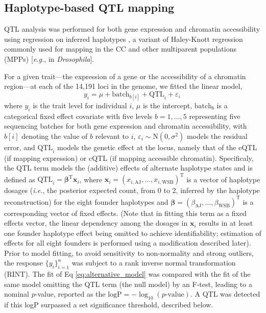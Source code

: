 \documentclass[9pt,twocolumn,twoside]{gsajnl}
\newcommand{\eg}{\emph{e.g.}\xspace}
\newcommand{\ie}{\emph{i.e.}\xspace}
\newcommand{\T}{^\mathrm{T}}
\newcommand{\bbeta}{\boldsymbol{\beta}}
\newcommand{\bx}{\mathbf{x}}
\begin{document}
\subsection{Haplotype-based QTL mapping}

QTL analysis was performed for both gene expression and chromatin accessibility using regression on inferred haplotypes \citep{Mott2000}, a variant of Haley-Knott regression \citep{Haley1992,Martinez1992} commonly used for mapping in the CC \citep{Valdar2006c,Aylor2011,Gralinski2015,Kelada2016,Donoghue2017,Keele2019} and other multiparent populations (MPPs) [\eg, \citet{King2012} in \textit{Drosophila}].

For a given trait---the expression of a gene or the accessibility of a chromatin region---at each of the 14,191 loci in the genome, we fitted the linear model,
\begin{equation}
  y_i = \mu + \text{batch}_{b[i]} + \text{QTL}_i + \varepsilon_i\, 
  \label{eq:alternative_model}
\end{equation}
where $y_{i}$ is the trait level for individual $i$, $\mu$ is the intercept, $\text{batch}_b$ is a categorical fixed effect covariate with five levels $b=1,\dots,5$ representing five sequencing batches for both gene expression and chromatin accessibility, with $b[i]$ denoting the value of $b$ relevant to $i$, $\varepsilon_i\sim\text{N}(0,\sigma^2)$ models the residual error, and $\text{QTL}_{i}$ models the genetic effect at the locus, namely that of the eQTL (if mapping expression) or cQTL (if mapping accessible chromatin). Specificaly, the QTL term models the (additive) effects of alternate haplotype states and is defined as $\text{QTL}_{i}=\bbeta\T\bx_i$, where $\bx_i=(x_{i,\text{AJ}},\dots,x_{i,\text{WSB}})\T$ is a vector of haplotype dosages (\ie, the posterior expected count, from 0 to 2, inferred by the haplotype reconstruction) for the eight founder haplotypes and $\bbeta=(\beta_\text{AJ},\dots,\beta_\text{WSB})\T$ is a corresponding vector of fixed effects. (Note that in fitting this term as a fixed effects vector, the linear dependency among the dosages in $\bx_i$ results in at least one founder haplotype effect being omitted to achieve identifiability; estimation of effects for all eight founders is performed using a modification described later). Prior to model fitting, to avoid sensitivity to non-normality and strong outliers, the response $\{y_i\}^n_{i=1}$ was subject to a rank inverse normal transformation (RINT).
The fit of Eq \ref{eq:alternative_model} was compared with the fit of the same model omitting the QTL term (the null model) by an F-test, leading to a nominal $p$-value, reported as the $\text{logP}=-\log_{10}(\text{$p$-value})$. A QTL was detected if this logP surpassed a set significance threshold, described below. %
\end{document}
